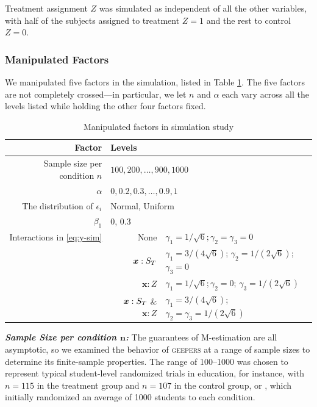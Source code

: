 \documentclass[]{article}
\begin{document}
Treatment assignment $Z$ was simulated as independent of all the other variables, with half of the subjects assigned to treatment $Z=1$ and the rest to control $Z=0$.


\subsubsection{Manipulated Factors}\label{sec:manipulatedFactors}
We manipulated five factors in the simulation, listed in Table \ref{tab:factor}.
The five factors are not completely crossed---in particular, we let $n$ and $\alpha$ each vary across all the levels listed while holding the other four factors fixed.

\begin{table}
    \caption{\label{tab:factor} Manipulated factors in simulation study}
  \centering
\begin{tabular}{r|rl}%
  \hline
  Factor &\multicolumn{2}{l}{Levels}\\
  \hline
Sample size per condition $n$ &\multicolumn{2}{l}{$100,200,\dots,900,1000$}\\
$\alpha$ &\multicolumn{2}{l}{$0,0.2,0.3,\dots,0.9,1$}\\
The distribution of $\epsilon_i$&\multicolumn{2}{l}{ Normal, Uniform}\\
$\beta_1$ & \multicolumn{2}{l}{0, 0.3}\\
Interactions in \eqref{eq:y-sim} & None & $\gamma_1=1/\sqrt{6};\gamma_2=\gamma_3=0$\\ 
& $\bm{x}:S_T$ & $\gamma_1=3/(4\sqrt{6})$; $\gamma_2=1/(2\sqrt{6})$; $\gamma_3=0$\\
& $\bm{x}:Z$&$\gamma_1=1/\sqrt{6};\gamma_2=0$; $\gamma_3=1/(2\sqrt{6})$\\
& $\bm{x}:S_T$ \& $\bm{x}:Z$& $\gamma_1=3/(4\sqrt{6})$; $\gamma_2=\gamma_3=1/(2\sqrt{6})$\\
\hline
\end{tabular}
\end{table}

\textbf{\emph{Sample Size per condition $\bm{n}$:}} The guarantees of M-estimation are all asymptotic, so we examined the behavior of \textsc{geepers} at a range of sample sizes to determine its finite-sample properties. The range of 100--1000 was chosen to represent typical student-level randomized trials in education, for instance, \citet{growthMindsetRuralBurnette} with $n=115$ in the treatment group and $n=107$ in the control group, or \citet{impactPaper}, which initially randomized an average of 1000 students to each condition.
\end{document}
